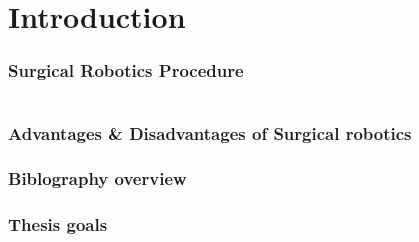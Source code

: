 \section{Introduction}

\begin{frame}
\frametitle{Surgical Robotics Procedure}
\begin{columns}
\end{columns}
\end{frame}

\begin{frame}
\frametitle{Advantages \& Disadvantages of Surgical robotics}
\end{frame}

\begin{frame}
\frametitle{Biblography overview}
\end{frame}

\begin{frame}
\frametitle{Thesis goals}
\end{frame}